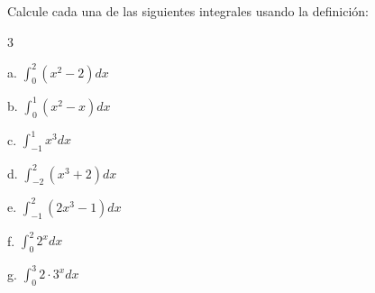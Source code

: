 





\begin{ejer}{Calcule cada una de las siguientes integrales usando la definición:}

\begin{multicols}{3}
\begin{minipage}[t]{\linewidth}
a. $\displaystyle\int_{0}^{2}\left( x^{2}-2\right) dx$


b. $\displaystyle\int_{0}^{1}\left(x^{2}-x\right) dx$


c. $\displaystyle\int_{-1}^{1}x^{3}dx$
\end{minipage}

\begin{minipage}[t]{\linewidth}
d. $\displaystyle\int_{-2}^{2}\left( x^{3}+2\right) dx$


e. $\displaystyle\int_{-1}^{2}\left( 2x^{3}-1\right) dx$
\end{minipage}

\begin{minipage}[t]{\linewidth}
f. $\displaystyle\int_{0}^{2}2^{x}dx$


g. $\displaystyle\int_{0}^{3}2\cdot 3^{x}dx$
\end{minipage}
\end{multicols}
\end{ejer}
\clearpage


